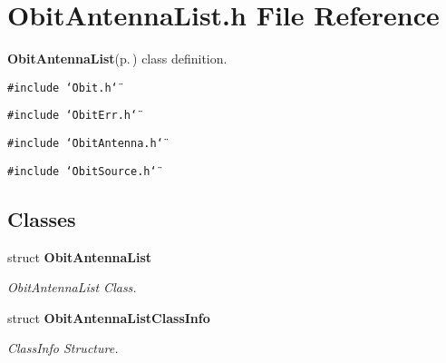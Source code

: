 \section{Obit\-Antenna\-List.h File Reference}
\label{ObitAntennaList_8h}
{\bf Obit\-Antenna\-List}{\rm (p.\,\pageref{structObitAntennaList})} class definition. 

{\tt \#include \char`\"{}Obit.h\char`\"{}}\par
{\tt \#include \char`\"{}Obit\-Err.h\char`\"{}}\par
{\tt \#include \char`\"{}Obit\-Antenna.h\char`\"{}}\par
{\tt \#include \char`\"{}Obit\-Source.h\char`\"{}}\par
\subsection*{Classes}
\begin{CompactItemize}
\item 
struct {\bf Obit\-Antenna\-List}
\begin{CompactList}\small\item\em Obit\-Antenna\-List Class. \item\end{CompactList}\item 
struct {\bf Obit\-Antenna\-List\-Class\-Info}
\begin{CompactList}\small\item\em Class\-Info Structure. \item\end{CompactList}\end{CompactItemize}
